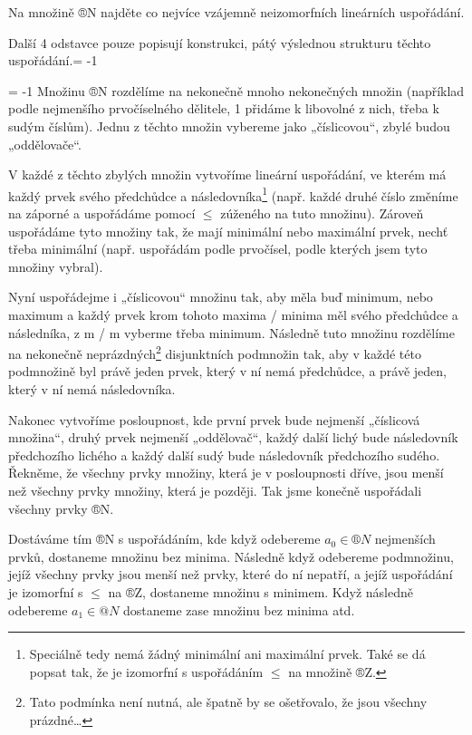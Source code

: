 \documentclass[12pt]{article}					%
\begin{document}
\begin{priklad}[1]
    Na množině ®N najděte co nejvíce vzájemně neizomorfních lineárních uspořádání.

    \begin{reseni}
        Další 4 odstavce pouze popisují konstrukci, pátý výslednou strukturu těchto uspořádání.\looseness = -1

        \looseness = -1 Množinu ®N rozdělíme na nekonečně mnoho nekonečných množin (například podle nejmenšího prvočíselného dělitele, 1 přidáme k libovolné z nich, třeba k sudým číslům). Jednu z těchto množin vybereme jako „číslicovou“, zbylé budou „oddělovače“.

        V každé z těchto zbylých množin vytvoříme lineární uspořádání, ve kterém má každý prvek svého předchůdce a následovníka\footnote{Speciálně tedy nemá žádný minimální ani maximální prvek. Také se dá popsat tak, že je izomorfní s uspořádáním $≤$ na množině ®Z.} (např. každé druhé číslo změníme na záporné a uspořádáme pomocí $≤$ zúženého na tuto množinu). Zároveň uspořádáme tyto množiny tak, že mají minimální nebo maximální prvek, nechť třeba minimální (např. uspořádám podle prvočísel, podle kterých jsem tyto množiny vybral).

Nyní uspořádejme i „číslicovou“ množinu tak, aby měla buď minimum, nebo maximum a každý prvek krom tohoto maxima / minima měl svého předchůdce a následníka, z m / m vyberme třeba minimum. Následně tuto množinu rozdělíme na nekonečně neprázdných\footnote{Tato podmínka není nutná, ale špatně by se ošetřovalo, že jsou všechny prázdné…} disjunktních podmnožin tak, aby v každé této podmnožině byl právě jeden prvek, který v ní nemá předchůdce, a právě jeden, který v ní nemá následovníka.

        Nakonec vytvoříme posloupnost, kde první prvek bude nejmenší „číslicová množina“, druhý prvek nejmenší „oddělovač“, každý další lichý bude následovník předchozího lichého a každý další sudý bude následovník předchozího sudého. Řekněme, že všechny prvky množiny, která je v posloupnosti dříve, jsou menší než všechny prvky množiny, která je později. Tak jsme konečně uspořádali všechny prvky ®N.

        Dostáváme tím ®N s uspořádáním, kde když odebereme $a_0 \in ®N$ nejmenších prvků, dostaneme množinu bez minima. Následně když odebereme podmnožinu, jejíž všechny prvky jsou menší než prvky, které do ní nepatří, a jejíž uspořádání je izomorfní s $≤$ na ®Z, dostaneme množinu s minimem. Když následně odebereme $a_1 \in @N$ dostaneme zase množinu bez minima atd.


\end{reseni}
\end{priklad}
\end{document}
